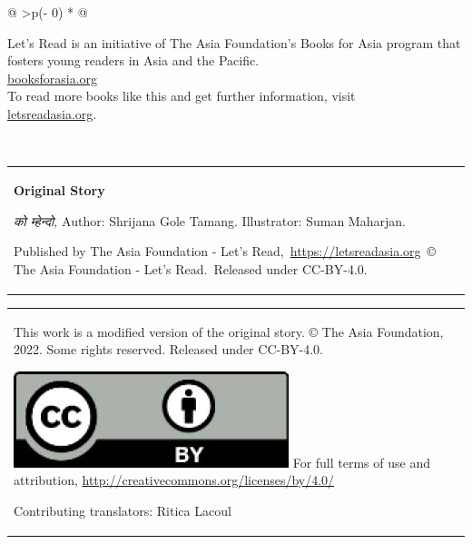 \documentclass[
  letterpaper,
  DIV=11,
  numbers=noendperiod,
  paper=6in:9in,
  pagesize=pdftex,
  headinclude=on,
  footinclude=on,
  12pt]{scrreprt}
\begin{document}
\begin{longtable}[]{@{}
  >{\centering\arraybackslash}p{(\columnwidth - 0\tabcolsep) * }@{}}
\toprule\noalign{}
\endhead
\bottomrule\noalign{}
\endlastfoot
\begin{minipage}[t]{\linewidth}\centering
Let's Read is an initiative of The Asia Foundation's Books for Asia
program that fosters young readers in Asia and the Pacific.\\
\href{http://letsreadasia.org/}{booksforasia.org}\\
To read more books like this and get further information, visit\\
\href{http://letsreadasia.org/}{letsreadasia.org}.\strut
\end{minipage} \\
\end{longtable}

\begin{longtable}[]{@{}
  >{\raggedright\arraybackslash}p{}@{}}
\toprule\noalign{}
\endhead
\bottomrule\noalign{}
\endlastfoot
\textbf{Original Story}

\emph{को म्हेन्दो,} Author: Shrijana Gole Tamang. Illustrator: Suman
Maharjan.

Published by The Asia Foundation - Let's
Read,~\href{https://letsreadasia.org/}{https://letsreadasia.org}~© The
Asia Foundation - Let's Read.~Released under CC-BY-4.0. \\
\end{longtable}

\begin{longtable}[]{@{}
  >{\raggedright\arraybackslash}p{}@{}}
\toprule\noalign{}
\endhead
\bottomrule\noalign{}
\endlastfoot
This work is a modified version of the original story. © The Asia
Foundation, 2022. Some rights reserved. Released under CC-BY-4.0.

\includegraphics{images/ccby.jpg} For full terms of use and attribution,
\url{http://creativecommons.org/licenses/by/4.0/}

Contributing translators: Ritica Lacoul \\
\end{longtable}
\end{document}

